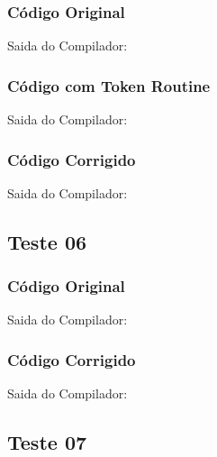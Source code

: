 \subsubsection{Código Original}


Saida do Compilador:




\subsubsection{Código com Token Routine}


Saida do Compilador:





\subsubsection{Código Corrigido}


Saida do Compilador:




\subsection{Teste 06}
\label{subsec:sintaticoTeste06}

\subsubsection{Código Original}


Saida do Compilador:




\subsubsection{Código Corrigido}


Saida do Compilador:




\subsection{Teste 07}
\label{subsec:sintaticoTeste07}

